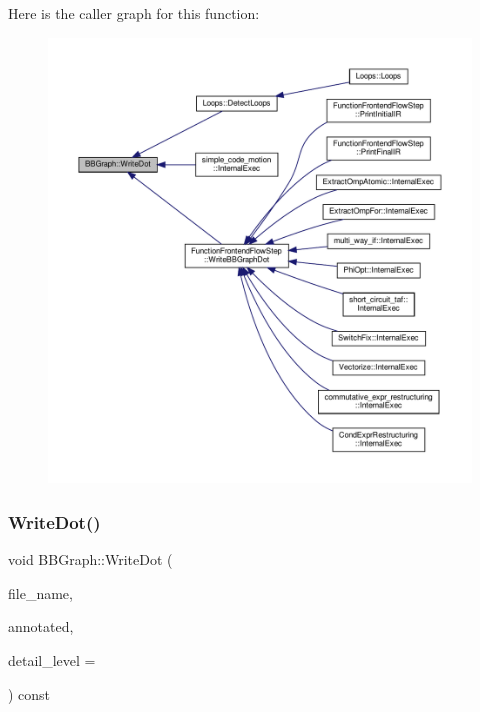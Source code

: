 Here is the caller graph for this function\+:
\nopagebreak
\begin{figure}[H]
\begin{center}
\leavevmode
\includegraphics[width=350pt]{dd/d5f/structBBGraph_a4f364a493a1d4c43bdee96970d545bf0_icgraph}
\end{center}
\end{figure}
\mbox{\label{structBBGraph_ac3de1a4ef5c0ffb8fda93854dc724473}} 
\subsubsection{\texorpdfstring{Write\+Dot()}{WriteDot()}\hspace{0.1cm}{\footnotesize\ttfamily [2/2]}}
{\footnotesize\ttfamily void B\+B\+Graph\+::\+Write\+Dot (\begin{DoxyParamCaption}\item[{const std\+::string \&}]{file\+\_\+name,  }\item[{const \hyperlink{classCustomUnorderedSet}{Custom\+Unordered\+Set}$<$ \hyperlink{graph_8hpp_abefdcf0544e601805af44eca032cca14}{vertex} $>$ \&}]{annotated,  }\item[{const int}]{detail\+\_\+level = {} }\end{DoxyParamCaption}) const}



